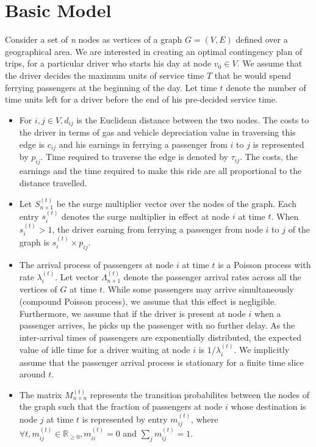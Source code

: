 
\section{Basic Model}

Consider a set of \emph{n} nodes as vertices of a graph $G=(V,E)$ defined over a geographical area. We are interested in creating an optimal contingency plan of trips, for a particular driver who starts his day at node $v_0 \in V$. We assume that the driver decides the maximum units of service time $T$ that he would spend ferrying passengers at the beginning of the day. Let time $t$ denote the number of time units left for a driver before the end of his pre-decided service time.
\begin{itemize}
\item For $i,j \in V, d_{ij}$ is the Euclidean distance between the two nodes. The costs to the driver in terms of gas and vehicle depreciation value in traversing this edge is $c_{ij}$ and his earnings in ferrying a passenger from $i$ to $j$ is represented by $p_{ij}$. Time required to traverse the edge is denoted by $\tau_{ij}$. The costs, the earnings and the time required to make this ride are all proportional to the distance travelled.

\item Let $S^{(t)}_{n \times 1}$ be the surge multiplier vector over the nodes of the graph. Each entry $s_i^{(t)}$ denotes the surge multiplier in effect at node $i$ at time $t$. When $s_i^{(t)} > 1$, the driver earning from ferrying a passenger from node $i$ to $j$ of the graph is $s_i^{(t)} \times p_{ij}$.

\item The arrival process of passengers at node $i$ at time $t$ is a Poisson process with rate $\lambda_i^{(t)}$. Let vector $\Lambda^{(t)}_{n \times 1}$ denote the passenger arrival rates across all the vertices of $G$ at time $t$. While some passengers may arrive simultaneously (compound Poisson process), we assume that this effect is negligible. Furthermore, we assume that if the driver is present at node $i$ when a passenger arrives, he picks up the passenger with no further delay. As the inter-arrival times of passengers are exponentially distributed, the expected value of idle time for a driver waiting at node $i$ is $1/\lambda_i^{(t)}$. We implicitly assume that the passenger arrival process is stationary for a finite time slice around $t$.

\item The matrix $M^{(t)}_{n \times n}$ represents the transition probabilites between the nodes of the graph such that the fraction of passengers at node $i$ whose destination is node $j$ at time $t$ is represented by entry $m_{ij}^{(t)}$, where $\forall t, m_{ij}^{(t)} \in \mathbb{R}_{\geq 0}, m_{ii}^{(t)}=0$ and $\sum\limits_{j}m_{ij}^{(t)}=1$.
\end{itemize}

